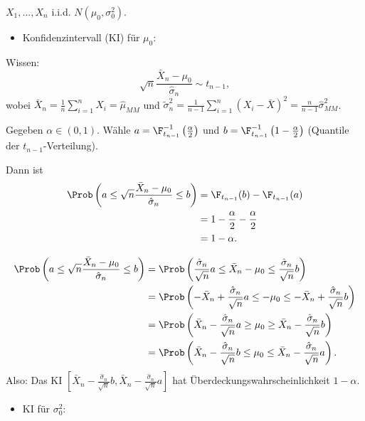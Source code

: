 \documentclass{tstextbook}
\begin{document}
\begin{example}[Normalverteilung]
	$ X_1, \ldots, X_n $ i.i.d. $ N(\mu_0, \sigma_0^2) $. 
	
	
	\begin{itemize} \item Konfidenzintervall (KI) für $ \mu_0 $: \end{itemize}
	
	
	Wissen: \[\sqrt{n}\frac{\bar{X}_n-\mu_0}{\hat{\sigma}_n} \sim t_{n-1},\] 
	wobei $ \bar{X}_n = \frac{1}{n}\sum_{i=1}^{n} X_i = \hat{\mu}_{MM} $ und $ \tilde{\sigma}_n^2 = \frac{1}{n-1} \sum_{i=1}^{n} (X_i-\bar{X})^2 = \frac{n}{n-1}\hat{\sigma}_{MM}^2 $.
	
	Gegeben $ \alpha \in (0,1) $. Wähle $ a = \F_{t_{n-1}}^{-1} \left(\frac{\alpha}{2}\right) $ und $ b = \F_{t_{n-1}}^{-1} \left(1-\frac{\alpha}{2}\right) $ (Quantile der $ t_{n-1} $-Verteilung).
	
	Dann ist 
	\[
	\begin{aligned}
		\Prob\left(a\le\sqrt{n}\frac{\bar{X}_n-\mu_0}{\hat{\sigma}_n} \le b \right) & = \F_{t_{n-1}}(b) - \F_{t_{n-1}}(a) \\
		& = 1 - \frac{\alpha}{2} - \frac{\alpha}{2} \\
		& = 1 - \alpha.
	\end{aligned}
	\]
	
	\[
	\begin{aligned}
		\Prob\left(a\le\sqrt{n}\frac{\bar{X}_n-\mu_0}{\hat{\sigma}_n} \le b \right) & = \Prob\left(\frac{\hat{\sigma}_n}{\sqrt{n}}a \le \bar{X}_n - \mu_0 \le \frac{\hat{\sigma}_n}{\sqrt{n}}b \right) \\
		& = \Prob\left(- \bar{X}_n + \frac{\hat{\sigma}_n}{\sqrt{n}}a \le - \mu_0 \le - \bar{X}_n + \frac{\hat{\sigma}_n}{\sqrt{n}}b \right) \\
		& = \Prob\left(\bar{X}_n - \frac{\hat{\sigma}_n}{\sqrt{n}}a \ge \mu_0 \ge \bar{X}_n - \frac{\hat{\sigma}_n}{\sqrt{n}}b \right) \\
		& = \Prob\left(\bar{X}_n - \frac{\hat{\sigma}_n}{\sqrt{n}}b \le \mu_0 \le \bar{X}_n - \frac{\hat{\sigma}_n}{\sqrt{n}}a \right).
	\end{aligned}
	\]
	Also: Das KI $ \left[\bar{X}_n-\frac{\hat{\sigma}_n}{\sqrt{n}}b, \bar{X}_n-\frac{\hat{\sigma}_n}{\sqrt{n}}a \right] $ hat Überdeckungswahrscheinlichkeit $ 1-\alpha $.
	
	
	\begin{itemize} \item KI für $ \sigma_0^2 $: \end{itemize}
	

\end{example}
\end{document}
